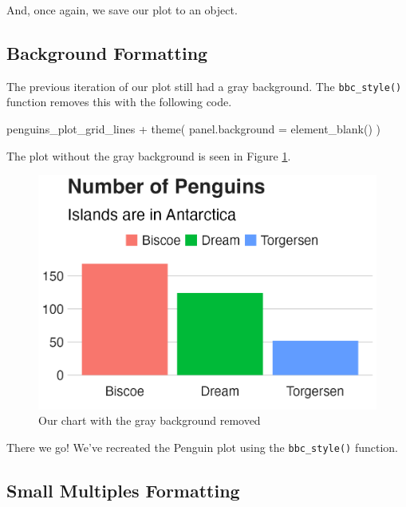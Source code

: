 \documentclass[
]{book}
\newenvironment{Shaded}{\begin{snugshade}}{\end{snugshade}}
\newcommand{\AttributeTok}[1]{\textcolor[rgb]{0.77,0.63,0.00}{#1}}
\newcommand{\FunctionTok}[1]{\textcolor[rgb]{0.00,0.00,0.00}{#1}}
\newcommand{\NormalTok}[1]{#1}
\newcommand{\SpecialCharTok}[1]{\textcolor[rgb]{0.00,0.00,0.00}{#1}}
\begin{document}
And, once again, we save our plot to an object.

\hypertarget{background-formatting}{%
\subsection*{Background Formatting}\label{background-formatting}}

The previous iteration of our plot still had a gray background. The \texttt{bbc\_style()} function removes this with the following code.

\begin{Shaded}
\begin{Highlighting}[]
\NormalTok{penguins\_plot\_grid\_lines }\SpecialCharTok{+}
  \FunctionTok{theme}\NormalTok{(}
    \AttributeTok{panel.background =} \FunctionTok{element\_blank}\NormalTok{()}
\NormalTok{  )}
\end{Highlighting}
\end{Shaded}

The plot without the gray background is seen in Figure \ref{fig:penguins-plot-no-bg}.

\begin{figure}
\includegraphics[width=1\linewidth]{custom-theme_files/figure-latex/penguins-plot-no-bg-1} \caption{Our chart with the gray background removed}\label{fig:penguins-plot-no-bg}
\end{figure}

There we go! We've recreated the Penguin plot using the \texttt{bbc\_style()} function.

\hypertarget{small-multiples-formatting}{%
\subsection*{Small Multiples Formatting}\label{small-multiples-formatting}}
\end{document}
